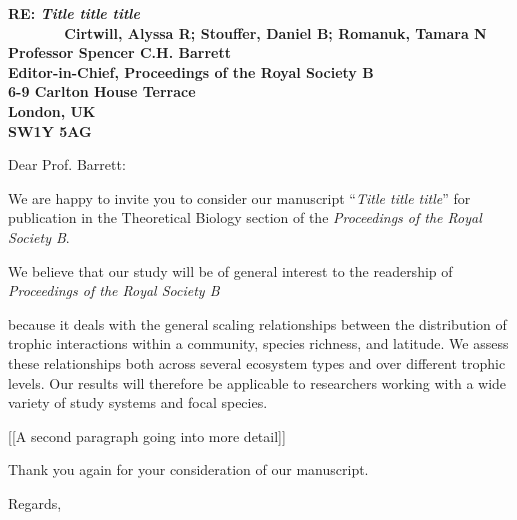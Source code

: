 \documentclass[12pt]{letter}
\newcommand{\mytitle}{\emph{Title title title}}
\newcommand{\myjournal}{\emph{Proceedings of the Royal Society B}}
\begin{document}
\begin{letter}{{\bf RE: \mytitle\\
               ~~~~~~~Cirtwill, Alyssa R; Stouffer, Daniel B; Romanuk, Tamara N\\
               \vspace*{20pt}
               Professor Spencer C.H. Barrett\\
               Editor-in-Chief, Proceedings of the Royal Society B\\
               6-9 Carlton House Terrace\\
               London, UK\\
               SW1Y 5AG\\
                }

\opening{Dear Prof. Barrett:}

We are happy to invite you to consider our manuscript 
``\mytitle'' for publication in the Theoretical Biology section of the \emph{\myjournal}. 


We believe that our study will be of general interest to the readership of \emph{\myjournal}} because it deals with the general scaling relationships between the distribution of trophic interactions within a community, species richness, and latitude. We assess these relationships both across several ecosystem types and over different trophic levels. Our results will therefore be applicable to researchers working with a wide variety of study systems and focal species.


[[A second paragraph going into more detail]]


Thank you again for your consideration of our manuscript.

\closing{Regards,}


\end{letter}


\end{document}
